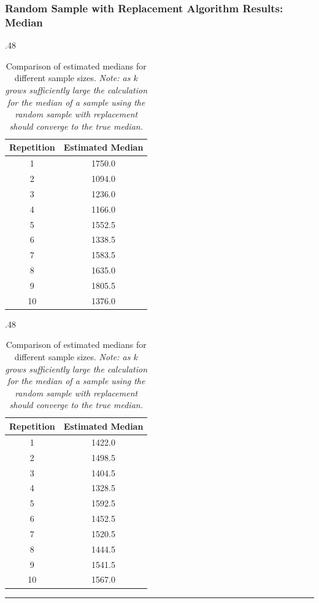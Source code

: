 \documentclass{article}
\begin{document}
\subsubsection*{Random Sample with Replacement Algorithm Results: Median}
\begin{table}[h]
\centering
\begin{subtable}{.48\textwidth}
\centering
\caption{Estimated Medians for $k=100$}
\begin{tabular}{cc}
\toprule
Repetition & Estimated Median \\
\midrule
1 & 1750.0 \\
2 & 1094.0 \\
3 & 1236.0 \\
4 & 1166.0 \\
5 & 1552.5 \\
6 & 1338.5 \\
7 & 1583.5 \\
8 & 1635.0 \\
9 & 1805.5 \\
10 & 1376.0 \\
\bottomrule
\end{tabular}
\end{subtable}
%
\begin{subtable}{.48\textwidth}
\centering
\caption{Estimated Medians for $k=500$}
\begin{tabular}{cc}
\toprule
Repetition & Estimated Median \\
\midrule
1 & 1422.0 \\
2 & 1498.5 \\
3 & 1404.5 \\
4 & 1328.5 \\
5 & 1592.5 \\
6 & 1452.5 \\
7 & 1520.5 \\
8 & 1444.5 \\
9 & 1541.5 \\
10 & 1567.0 \\
\bottomrule
\end{tabular}
\end{subtable}
\caption{Comparison of estimated medians for different sample sizes. \textit{Note: as $k$ grows sufficiently large the calculation for the median of a sample using the random sample with replacement should converge to the true median.}}
\end{table}

\noindent\rule{\textwidth}{0.4pt}
\newpage

\end{document}

